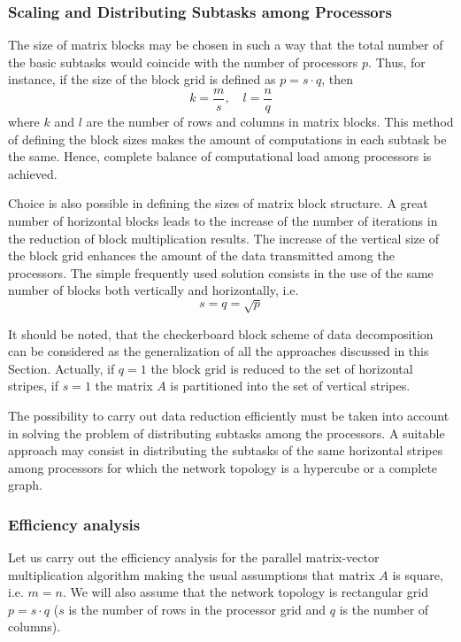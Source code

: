 \subsubsection{Scaling and Distributing Subtasks among Processors} %
\label{ssub:scaling_and_distributing_subtasks_among_processors}
The size of matrix blocks may be chosen in such a way that the total number of the basic subtasks would
coincide with the number of processors $p$. Thus, for instance, if the size of the block grid is defined as $p=s\cdot q$, then
\[
  k = \frac{m}{s}, \quad l = \frac{n}{q}
\]
where $k$ and $l$ are the number of rows and columns in matrix blocks. This method of defining the block sizes makes the amount of computations in each subtask be the same. Hence, complete balance of computational load among processors is achieved.

Choice is also possible in defining the sizes of matrix block structure. A great number of horizontal blocks leads to the increase of the number of iterations in the reduction of block multiplication results. The increase of the vertical size of the block grid enhances the amount of the data transmitted among the processors. The simple frequently used solution consists in the use of the same number of blocks both vertically and horizontally, i.e.
\[
  s = q = \sqrt{p}
\]

It should be noted, that the checkerboard block scheme of data decomposition can be considered as the generalization of all the approaches discussed in this Section. Actually, if $q=1$ the block grid is reduced to the set of horizontal stripes, if $s=1$ the matrix $A$ is partitioned into the set of vertical stripes.

The possibility to carry out data reduction efficiently must be taken into account in solving the problem of distributing subtasks among the processors. A suitable approach may consist in distributing the subtasks of the same horizontal stripes among processors for which the network topology is a hypercube or a complete graph.


\subsubsection{Efficiency analysis} %
\label{ssub:efficiency_analysis}
Let us carry out the efficiency analysis for the parallel matrix-vector multiplication algorithm making the usual
assumptions that matrix $A$ is square, i.e. $m=n$. We will also assume that the network topology is rectangular grid
$p=s\cdot q$ ($s$ is the number of rows in the processor grid and $q$ is the number of columns).

